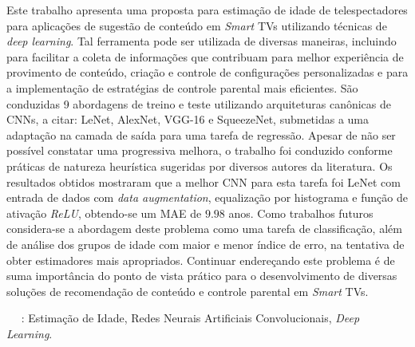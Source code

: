 
  Este trabalho apresenta uma proposta para estimação de idade de telespectadores para aplicações de sugestão de conteúdo em \emph{Smart} TVs utilizando técnicas de \emph{deep learning}. Tal ferramenta pode ser utilizada de diversas maneiras, incluindo para facilitar a coleta de informações que contribuam para melhor experiência de provimento de conteúdo, criação e controle de configurações personalizadas e para a implementação de estratégias de controle parental mais eficientes. São conduzidas 9 abordagens de treino e teste utilizando arquiteturas canônicas de CNNs, a citar: LeNet, AlexNet, VGG-16 e SqueezeNet, submetidas a uma adaptação na camada de saída para uma tarefa de regressão. Apesar de não ser possível constatar uma progressiva melhora, o trabalho foi conduzido conforme práticas de natureza heurística sugeridas por diversos autores da literatura. Os resultados obtidos mostraram que a melhor CNN para esta tarefa foi LeNet com entrada de dados com \emph{data augmentation}, equalização por histograma e função de ativação \emph{ReLU}, obtendo-se um MAE de $9.98$ anos. Como trabalhos futuros considera-se a abordagem deste problema como uma tarefa de classificação, além de análise dos grupos de idade com maior e menor índice de erro, na tentativa de obter estimadores mais apropriados.  Continuar endereçando este problema é de suma importância do ponto de vista prático para o desenvolvimento de diversas soluções de recomendação de conteúdo e controle parental em \emph{Smart} TVs.


  \ \ \newline
  : Estimação de Idade, Redes Neurais Artificiais Convolucionais, \emph{Deep Learning}.
